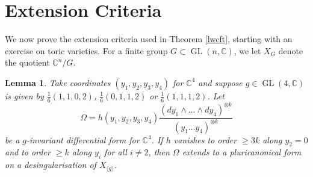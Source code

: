 \documentclass[12pt, a4paper]{article}
\newtheorem{lemma}[thm]{Lemma}
\newcommand{\CC}{\mathbb{C}}
\newcommand{\la}{\langle}
\newcommand{\ra}{\rangle}
\newcommand{\opn}{\operatorname}
\begin{document}
 \section{Extension Criteria}\label{ExtensionSec}
We now prove the extension criteria used in Theorem \ref{lwcft}, starting with an exercise on toric varieties.
For a finite group $G \subset \opn{GL}(n, \CC)$, we let $X_G$ denote the quotient $\CC^n/G$.
\begin{lemma}\label{toriclemma}
  Take coordinates
  $(y_1, y_2, y_3, y_4)$
  for $\CC^4$ and suppose $g \in \opn{GL}(4, \CC)$ is given by
  $\frac{1}{6}(1,1,0,2)$,
  $\frac{1}{6}(0,1,1,2)$
  or
  $\frac{1}{6}(1,1,1,2)$. 
  Let 
  \[
  \Omega = h(y_1, y_2, y_3, y_4) 
  \frac{(dy_1 \wedge \ldots \wedge dy_4)^{\otimes k}}{(y_1 \ldots y_4)^{\otimes k}}
  \]
  be a $g$-invariant differential form for $\CC^4$.
  If $h$ vanishes to order $\geq 3k$ along $y_2 =0$ and to order $\geq k$ along $y_i$ for all $i \neq 2$, then $\Omega$ extends to a pluricanonical form on a desingularisation of $X_{\la g \ra}$.  
\end{lemma}
\end{document}
